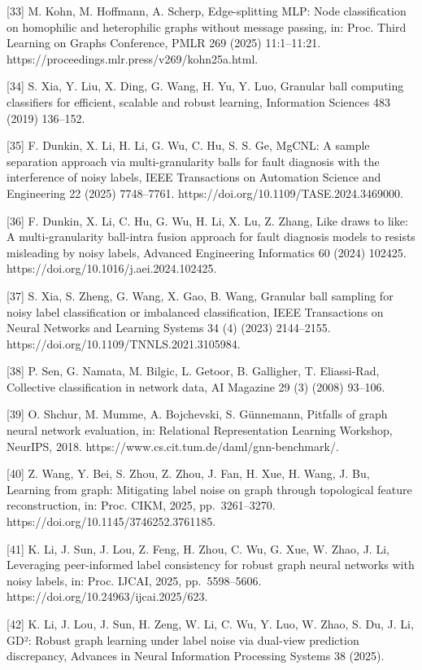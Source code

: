 {[}33{]} M. Kohn, M. Hoffmann, A. Scherp, Edge-splitting MLP: Node classification on homophilic and heterophilic graphs without message passing, in: Proc. Third Learning on Graphs Conference, PMLR 269 (2025) 11:1--11:21. https://proceedings.mlr.press/v269/kohn25a.html.

{[}34{]} S. Xia, Y. Liu, X. Ding, G. Wang, H. Yu, Y. Luo, Granular ball computing classifiers for efficient, scalable and robust learning, Information Sciences 483 (2019) 136--152.

{[}35{]} F. Dunkin, X. Li, H. Li, G. Wu, C. Hu, S. S. Ge, MgCNL: A sample separation approach via multi-granularity balls for fault diagnosis with the interference of noisy labels, IEEE Transactions on Automation Science and Engineering 22 (2025) 7748--7761. https://doi.org/10.1109/TASE.2024.3469000.

{[}36{]} F. Dunkin, X. Li, C. Hu, G. Wu, H. Li, X. Lu, Z. Zhang, Like draws to like: A multi-granularity ball-intra fusion approach for fault diagnosis models to resists misleading by noisy labels, Advanced Engineering Informatics 60 (2024) 102425. https://doi.org/10.1016/j.aei.2024.102425.

{[}37{]} S. Xia, S. Zheng, G. Wang, X. Gao, B. Wang, Granular ball sampling for noisy label classification or imbalanced classification, IEEE Transactions on Neural Networks and Learning Systems 34 (4) (2023) 2144--2155. https://doi.org/10.1109/TNNLS.2021.3105984.

{[}38{]} P. Sen, G. Namata, M. Bilgic, L. Getoor, B. Galligher, T. Eliassi-Rad, Collective classification in network data, AI Magazine 29 (3) (2008) 93--106.

{[}39{]} O. Shchur, M. Mumme, A. Bojchevski, S. Günnemann, Pitfalls of graph neural network evaluation, in: Relational Representation Learning Workshop, NeurIPS, 2018. https://www.cs.cit.tum.de/daml/gnn-benchmark/.

{[}40{]} Z. Wang, Y. Bei, S. Zhou, Z. Zhou, J. Fan, H. Xue, H. Wang, J. Bu, Learning from graph: Mitigating label noise on graph through topological feature reconstruction, in: Proc. CIKM, 2025, pp.~3261--3270. https://doi.org/10.1145/3746252.3761185.

{[}41{]} K. Li, J. Sun, J. Lou, Z. Feng, H. Zhou, C. Wu, G. Xue, W. Zhao, J. Li, Leveraging peer-informed label consistency for robust graph neural networks with noisy labels, in: Proc. IJCAI, 2025, pp.~5598--5606. https://doi.org/10.24963/ijcai.2025/623.

{[}42{]} K. Li, J. Lou, J. Sun, H. Zeng, W. Li, C. Wu, Y. Luo, W. Zhao, S. Du, J. Li, GD²: Robust graph learning under label noise via dual-view prediction discrepancy, Advances in Neural Information Processing Systems 38 (2025).


